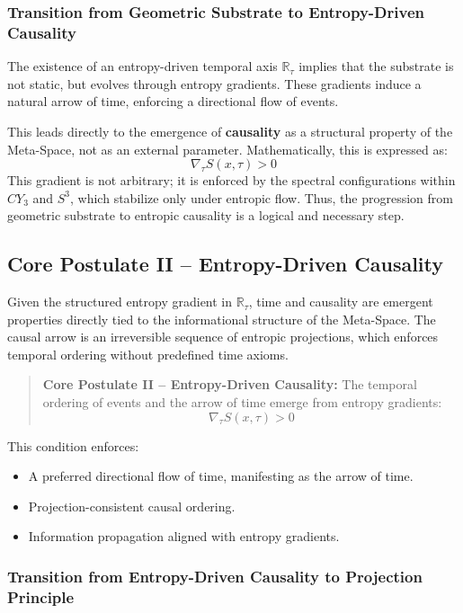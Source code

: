 \documentclass[10.5pt,a4paper]{article}
\begin{document}
\subsubsection*{Transition from Geometric Substrate to Entropy-Driven Causality}

The existence of an entropy-driven temporal axis \(\mathbb{R}_\tau\) implies that the substrate is not static, but evolves through entropy gradients. These gradients induce a natural arrow of time, enforcing a directional flow of events.

This leads directly to the emergence of \textbf{causality} as a structural property of the Meta-Space, not as an external parameter. Mathematically, this is expressed as:
\[
\nabla_\tau S(x, \tau) > 0
\]
This gradient is not arbitrary; it is enforced by the spectral configurations within \(CY_3\) and \(S^3\), which stabilize only under entropic flow. Thus, the progression from geometric substrate to entropic causality is a logical and necessary step.

\subsection{Core Postulate II – Entropy-Driven Causality}

Given the structured entropy gradient in \(\mathbb{R}_\tau\), time and causality are emergent properties directly tied to the informational structure of the Meta-Space. The causal arrow is an irreversible sequence of entropic projections, which enforces temporal ordering without predefined time axioms.

\begin{quote}
\textbf{Core Postulate II – Entropy-Driven Causality:}  
The temporal ordering of events and the arrow of time emerge from entropy gradients:
\[
\nabla_\tau S(x, \tau) > 0
\]
\end{quote}

This condition enforces:
\begin{itemize}
    \item A preferred directional flow of time, manifesting as the arrow of time.
    \item Projection-consistent causal ordering.
    \item Information propagation aligned with entropy gradients.
\end{itemize}

\subsubsection*{Transition from Entropy-Driven Causality to Projection Principle}
\end{document}
